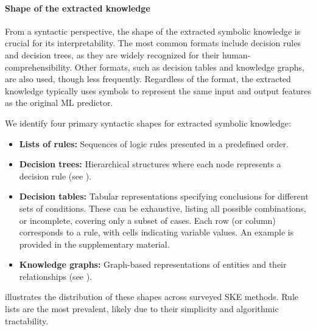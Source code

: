 \paragraph{Shape of the extracted knowledge}
%
From a syntactic perspective, the shape of the extracted symbolic knowledge is crucial for its interpretability.
%
The most common formats include decision rules and decision trees, as they are widely recognized for their human-comprehensibility.
%
Other formats, such as decision tables and knowledge graphs, are also used, though less frequently.
%
Regardless of the format, the extracted knowledge typically uses symbols to represent the same input and output features as the original \gls{ML} predictor.

We identify four primary syntactic shapes for extracted symbolic knowledge:
%
\begin{itemize}
    \item \textbf{Lists of rules:} Sequences of logic rules presented in a predefined order.
    \item \textbf{Decision trees:} Hierarchical structures where each node represents a decision rule (see ).
    \item \textbf{Decision tables:} Tabular representations specifying conclusions for different sets of conditions.
    These can be exhaustive, listing all possible combinations, or incomplete, covering only a subset of cases.
    Each row (or column) corresponds to a rule, with cells indicating variable values.
    An example is provided in the supplementary material.
    \item \textbf{Knowledge graphs:} Graph-based representations of entities and their relationships (see ).
\end{itemize}

 illustrates the distribution of these shapes across surveyed \gls{SKE} methods.
%
Rule lists are the most prevalent, likely due to their simplicity and algorithmic tractability.

